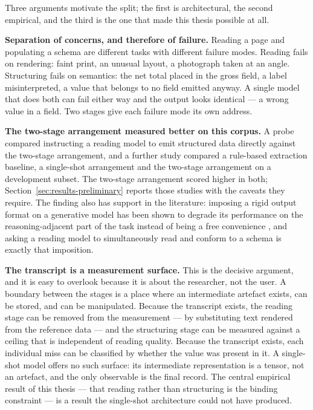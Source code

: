 Three arguments motivate the split; the first is architectural, the second empirical, and the
third is the one that made this thesis possible at all.

\textbf{Separation of concerns, and therefore of failure.} Reading a page and populating a
schema are different tasks with different failure modes. Reading fails on rendering: faint
print, an unusual layout, a photograph taken at an angle. Structuring fails on semantics: the
net total placed in the gross field, a label misinterpreted, a value that belongs to no field
emitted anyway. A single model that does both can fail either way and the output looks
identical --- a wrong value in a field. Two stages give each failure mode its own address.

\textbf{The two-stage arrangement measured better on this corpus.} A probe compared
instructing a reading model to emit structured data
directly against the two-stage arrangement, and a further study compared a rule-based
extraction baseline, a single-shot arrangement and the two-stage arrangement on a development
subset. The two-stage arrangement scored higher in both; Section~\ref{sec:results-preliminary} reports those
studies with the caveats they require. The finding also has support in the literature:
imposing a rigid output format on a generative model has been shown to degrade its
performance on the reasoning-adjacent part of the task instead of being a free convenience
\parencite{tam2024format}, and asking a reading model to simultaneously read and conform to a
schema is exactly that imposition.

\textbf{The transcript is a measurement surface.} This is the decisive argument, and it is
easy to overlook because it is about the researcher, not the user. A boundary between
the stages is a place where an intermediate artefact exists, can be stored, and can be
manipulated. Because the transcript exists, the reading stage can be removed from the
measurement --- by substituting text rendered from the reference data --- and the structuring
stage can be measured against a ceiling that is independent of reading quality. Because the
transcript exists, each individual miss can be classified by whether the value was present in
it. A single-shot model offers no such surface: its intermediate representation is a tensor,
not an artefact, and the only observable is the final record. The central empirical result of
this thesis --- that reading rather than structuring is the binding constraint --- is a result
the single-shot architecture could not have produced.


